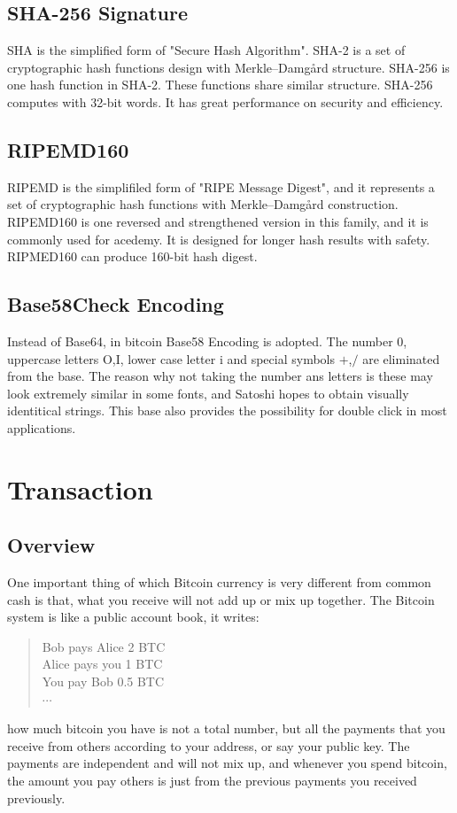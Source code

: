 \documentclass[12pt,a4paper]{article}
\begin{document}
\subsection{SHA-256 Signature}

SHA is the simplified form of "Secure Hash Algorithm". SHA-2 is a set of cryptographic hash functions design with Merkle–Damgård structure. SHA-256 is one hash function in SHA-2. These functions share similar structure. SHA-256 computes with 32-bit words. It has great performance on security and efficiency.

\subsection{RIPEMD160}
 RIPEMD is the simplifiled form of "RIPE Message Digest", and it represents a set of cryptographic hash functions with Merkle–Damgård construction. RIPEMD160 is one reversed and strengthened version in this family, and it is commonly used for acedemy. It is designed for longer hash results with safety. RIPMED160 can produce 160-bit hash digest.
 
 \subsection{Base58Check Encoding}
 Instead of Base64, in bitcoin Base58 Encoding is adopted. The number 0, uppercase letters O,I, lower case letter i and special symbols $+$,$/$ are eliminated from the base. The reason why not taking the number ans letters is these may look extremely similar in some fonts, and Satoshi hopes to obtain visually identitical strings. This base also provides the possibility for double click in most applications. 

\section{Transaction}
\subsection{Overview}
One important thing of which Bitcoin currency is very different from common cash is that, what you receive will not add up or mix up together. The Bitcoin system is like a public account book, it writes:
\begin{quote}
Bob pays Alice 2 BTC \\
Alice pays you 1 BTC\\
You pay Bob 0.5 BTC\\
$\cdots$
\end{quote}
how much bitcoin you have is not a total number, but all the payments that you receive from others according to your address, or say your public key. The payments are independent and will not mix up, and whenever you spend bitcoin, the amount you pay others is just from the previous payments you received previously. 
\end{document}
